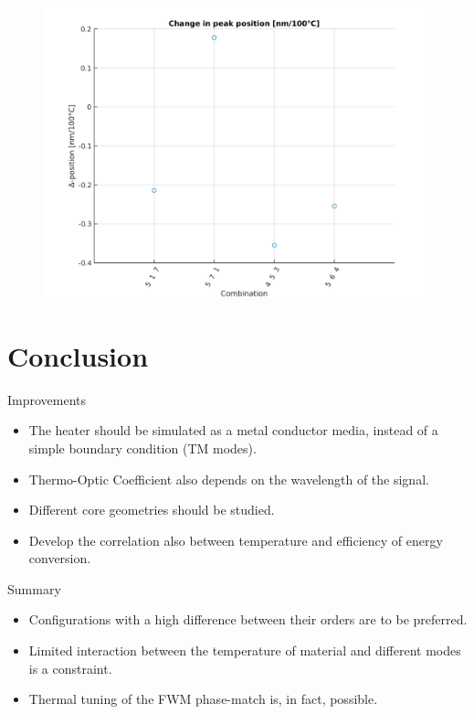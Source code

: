 \documentclass[11pt, leqno]{beamer}
\begin{document}
\begin{frame}
	\begin{figure}
		\centering
		\includegraphics[height=.85\textheight]{asym_ppc2.png}
	\end{figure}
\end{frame}
\section{Conclusion}
\begin{frame}{Improvements}
	\begin{itemize}
		\item	The heater should be simulated as a metal conductor media, instead of a simple boundary condition (TM modes).
		\item	Thermo-Optic Coefficient also depends on the wavelength of the signal.
		\item	Different core geometries should be studied.
		\item	Develop the correlation also between temperature and efficiency of energy conversion.
	\end{itemize}
\end{frame}
\begin{frame}{Summary}
	\begin{itemize}
		\item Configurations with a high difference between their orders are to be preferred.
		\item Limited interaction between the temperature of material and different modes is a constraint.
		\item Thermal tuning of the FWM phase-match is, in fact, possible.
	\end{itemize}
\end{frame}
\end{document}
